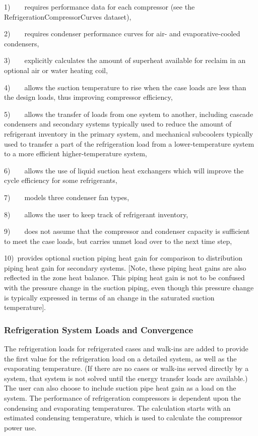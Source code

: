 1)~~~~requires performance data for each compressor (see the RefrigerationCompressorCurves dataset),

2)~~~~requires condenser performance curves for air- and evaporative-cooled condensers,

3)~~~~explicitly calculates the amount of superheat available for reclaim in an optional air or water heating coil,

4)~~~~allows the suction temperature to rise when the case loads are less than the design loads, thus improving compressor efficiency,

5)~~~~allows the transfer of loads from one system to another, including cascade condensers and secondary systems typically used to reduce the amount of refrigerant inventory in the primary system, and mechanical subcoolers typically used to transfer a part of the refrigeration load from a lower-temperature system to a more efficient higher-temperature system,

6)~~~~allows the use of liquid suction heat exchangers which will improve the cycle efficiency for some refrigerants,

7)~~~~models three condenser fan types,

8)~~~~allows the user to keep track of refrigerant inventory,

9)~~~~does not assume that the compressor and condenser capacity is sufficient to meet the case loads, but carries unmet load over to the next time step,

10)~provides optional suction piping heat gain for comparison to distribution piping heat gain for secondary systems. {[}Note, these piping heat gains are also reflected in the zone heat balance. This piping heat gain is not to be confused with the pressure change in the suction piping, even though this pressure change is typically expressed in terms of an change in the saturated suction temperature{]}.

\subsubsection{Refrigeration System Loads and Convergence}\label{refrigeration-system-loads-and-convergence}

The refrigeration loads for refrigerated cases and walk-ins are added to provide the first value for the refrigeration load on a detailed system, as well as the evaporating temperature. (If there are no cases or walk-ins served directly by a system, that system is not solved until the energy transfer loads are available.) The user can also choose to include suction pipe heat gain as a load on the system. The performance of refrigeration compressors is dependent upon the condensing and evaporating temperatures. The calculation starts with an estimated condensing temperature, which is used to calculate the compressor power use.


